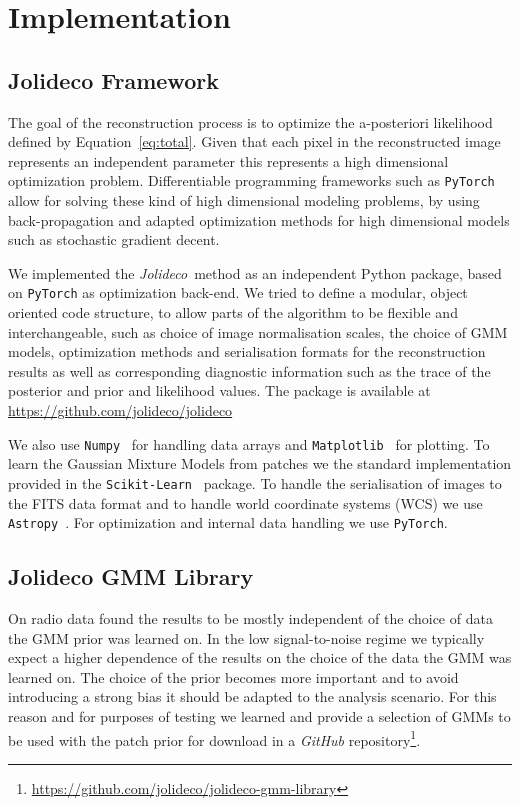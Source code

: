 \documentclass[twocolumn]{aastex631}
\newcommand{\jolideco}{\textit{Jolideco}~}
\begin{document}
    \section{Implementation}
    \subsection{Jolideco Framework}
    The goal of the reconstruction process is to optimize the a-posteriori
    likelihood defined by Equation~\ref{eq:total}. Given that each pixel
    in the reconstructed image represents an independent parameter
    this represents a high dimensional optimization problem.
    Differentiable programming frameworks such as \texttt{PyTorch}~\citep{Pytorch2019}
    allow for solving these kind of high dimensional modeling problems, by using
    back-propagation and adapted optimization methods for high dimensional
    models such as stochastic gradient decent.

    We implemented the \jolideco method as an independent Python package, 
    based on \texttt{PyTorch} as optimization back-end. We tried to define a modular,
    object oriented code structure, to allow parts of the algorithm to be
    flexible and interchangeable, such as choice of image normalisation scales,
    the choice of GMM models, optimization methods and serialisation formats for the 
    reconstruction results as well as corresponding diagnostic information
    such as the trace of the posterior and prior and likelihood values.
    The package is available at \url{https://github.com/jolideco/jolideco}

    We also use \texttt{Numpy}~\citep{Numpy2020} for handling data arrays and
    \texttt{Matplotlib}~\citep{Hunter2007} for plotting.
    To learn the Gaussian Mixture Models from patches we the standard implementation
    provided in the \texttt{Scikit-Learn}~\citep{Skimage2014} package. To handle the 
    serialisation of images to the FITS data format and to handle world coordinate
    systems (WCS) we use \texttt{Astropy}~\citep{Astropy2018}.
    For optimization and internal data handling we use \texttt{PyTorch}.

    \subsection{Jolideco GMM Library}
    \label{ssec:jolideco-gmm-library}
    On radio data \cite{Bouman2016} found the results to be mostly independent 
    of the choice of data the GMM prior was learned on. In the low signal-to-noise
    regime we typically expect a higher dependence of the results on the choice of the
    data the GMM was learned on. The choice of the prior becomes more important
    and to avoid introducing a strong bias it should be adapted to the analysis 
    scenario. For this reason and for purposes of testing we learned and
    provide a selection of GMMs to be used with the patch prior for download in a \textit{GitHub} repository\footnote{\url{https://github.com/jolideco/jolideco-gmm-library}}.
    
\end{document}

